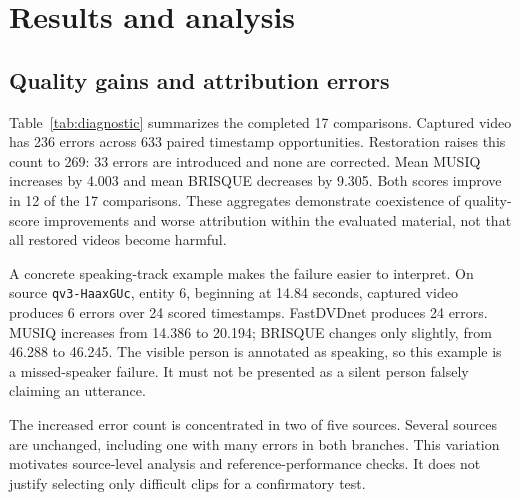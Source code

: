 \section{Results and analysis}\label{sec:results}
\subsection{Quality gains and attribution errors}
Table~\ref{tab:diagnostic} summarizes the completed 17 comparisons. Captured video has 236 errors across 633 paired timestamp opportunities. Restoration raises this count to 269: 33 errors are introduced and none are corrected. Mean MUSIQ increases by 4.003 and mean BRISQUE decreases by 9.305. Both scores improve in 12 of the 17 comparisons. These aggregates demonstrate coexistence of quality-score improvements and worse attribution within the evaluated material, not that all restored videos become harmful.

A concrete speaking-track example makes the failure easier to interpret. On source \texttt{qv3-HaaxGUc}, entity 6, beginning at 14.84 seconds, captured video produces 6 errors over 24 scored timestamps. FastDVDnet produces 24 errors. MUSIQ increases from 14.386 to 20.194; BRISQUE changes only slightly, from 46.288 to 46.245. The visible person is annotated as speaking, so this example is a missed-speaker failure. It must not be presented as a silent person falsely claiming an utterance.

The increased error count is concentrated in two of five sources. Several sources are unchanged, including one with many errors in both branches. This variation motivates source-level analysis and reference-performance checks. It does not justify selecting only difficult clips for a confirmatory test.

\begin{table}[t]
\centering\small
\caption{Completed exploratory controls on the same 17 comparisons. Counts are over 633 paired opportunities, not independent samples. New/fixed are relative to captured video. Quality changes are comparison-macro averages.}
\label{tab:diagnostic}
\setlength{\tabcolsep}{3pt}
\end{table}

